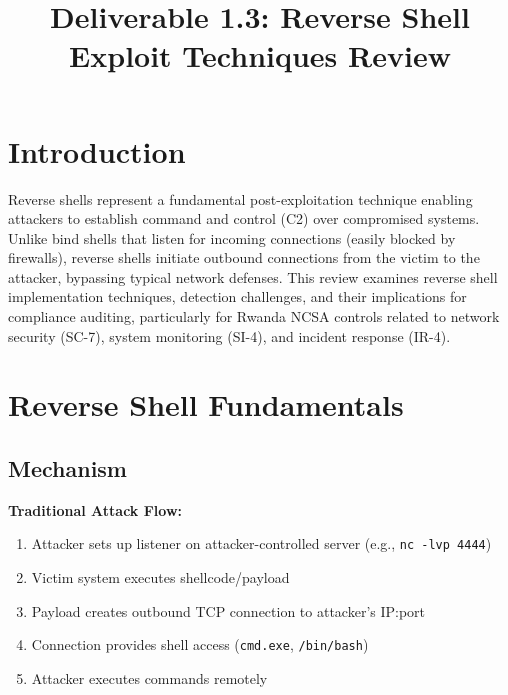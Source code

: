 \documentclass[11pt,conference]{IEEEtran}
\begin{document}
\title{Deliverable 1.3: Reverse Shell Exploit Techniques Review}

\author{
}

\maketitle

\section{Introduction}

Reverse shells represent a fundamental post-exploitation technique enabling attackers to establish command and control (C2) over compromised systems. Unlike bind shells that listen for incoming connections (easily blocked by firewalls), reverse shells initiate outbound connections from the victim to the attacker, bypassing typical network defenses. This review examines reverse shell implementation techniques, detection challenges, and their implications for compliance auditing, particularly for Rwanda NCSA controls related to network security (SC-7), system monitoring (SI-4), and incident response (IR-4).

\section{Reverse Shell Fundamentals}

\subsection{Mechanism}

\textbf{Traditional Attack Flow:}
\begin{enumerate}
    \item Attacker sets up listener on attacker-controlled server (e.g., \texttt{nc -lvp 4444})
    \item Victim system executes shellcode/payload
    \item Payload creates outbound TCP connection to attacker's IP:port
    \item Connection provides shell access (\texttt{cmd.exe}, \texttt{/bin/bash})
    \item Attacker executes commands remotely
\end{enumerate}
\end{document}

